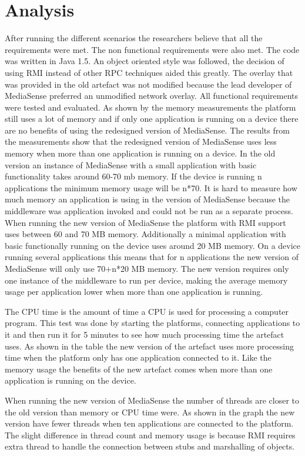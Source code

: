 \section{Analysis}
After running the different scenarios the researchers believe that all the requirements were met. The non functional requirements were also met. The code was written in Java 1.5. An object oriented style was followed, the decision of using RMI instead of other RPC techniques aided this greatly. The overlay that was provided in the old artefact was not modified because the lead developer of MediaSense preferred an unmodified network overlay. All functional requirements were tested and evaluated. As shown by the memory measurements the platform still uses a lot of memory and if only one application is running on a device there are no benefits of using the redesigned version of MediaSense. The results from the measurements show that the redesigned version of MediaSense uses less memory when more than one application is running on a device. In the old version an instance of MediaSense with a small application with basic functionality takes around 60-70 mb memory. If the device is running n applications the minimum memory usage will be n*70. It is hard to measure how much memory an application is using in the version of MediaSense because the middleware was application invoked and could not be run as a separate process. When running the new version of MediaSense the platform with RMI support uses between 60 and 70 MB memory. Additionally a minimal application with basic functionally running on the device uses around 20 MB memory. On a device running several applications this means that for n applications the new version of MediaSense will only use 70+n*20 MB memory. The new version requires only one instance of the middleware to run per device, making the average memory usage per application lower when more than one application is running.

The CPU time is the amount of time a CPU is used for processing a computer program. This test was done by starting the platforms, connecting applications to it and then run it for 5 minutes to see how much processing time the artefact uses. As shown in the table the new version of the artefact uses more processing time when the platform only has one application connected to it. Like the memory usage the benefits of the new artefact comes when more than one application is running on the device. 

When running the new version of MediaSense the number of threads are closer to the old version than memory or CPU time were. As shown in the graph the new version have fewer threads when ten applications are connected to the platform. The slight difference in thread count and memory usage is because RMI requires extra thread to handle the connection between stubs and marshalling of objects. 

